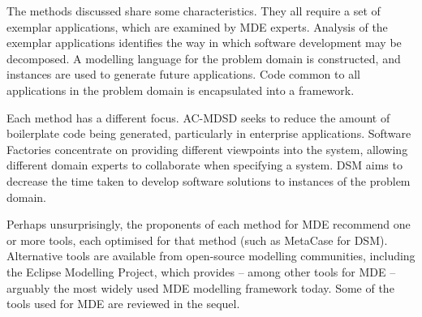 The methods discussed share some characteristics. They all require a set of exemplar applications, which are examined by MDE experts. Analysis of the exemplar applications identifies the way in which software development may be decomposed. A modelling language for the problem domain is constructed, and instances are used to generate future applications. Code common to all applications in the problem domain is encapsulated into a framework.

Each method has a different focus. AC-MDSD seeks to reduce the amount of boilerplate code being generated, particularly in enterprise applications. Software Factories concentrate on providing different viewpoints into the system, allowing different domain experts to collaborate when specifying a system. DSM aims to decrease the time taken to develop software solutions to instances of the problem domain.

Perhaps unsurprisingly, the proponents of each method for MDE recommend one or more tools, each optimised for that method (such as MetaCase for DSM). Alternative tools are available from open-source modelling communities, including the Eclipse Modelling Project, which provides -- among other tools for MDE -- arguably the most widely used MDE modelling framework today. Some of the tools used for MDE are reviewed in the sequel.